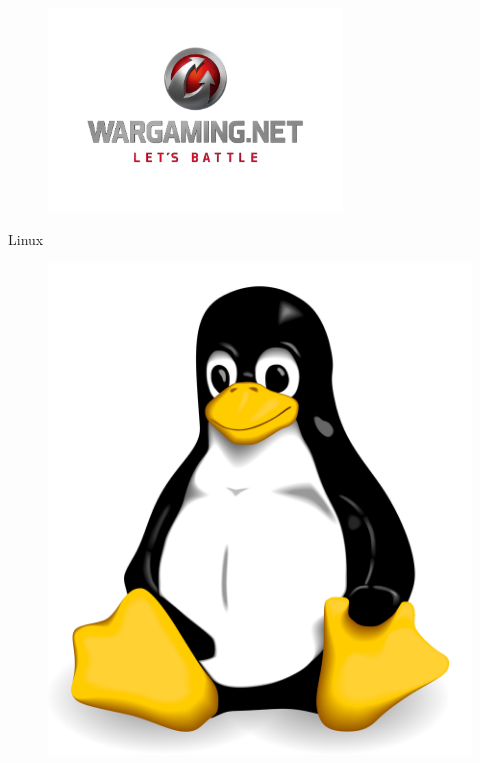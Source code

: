 \documentclass[aspectratio=169]{beamer}
\begin{document}
{
\logo{}

\begin{frame}{}
    \begin{figure}[htb]
    \includegraphics[height=0.8\textheight]{wg-logo.png}
    \end{figure}
\end{frame}
}

\begin{frame}{Linux}
    \begin{figure}[htb]
    \includegraphics[height=0.8\textheight]{tux.png}
    \end{figure}
\end{frame}
\end{document}
